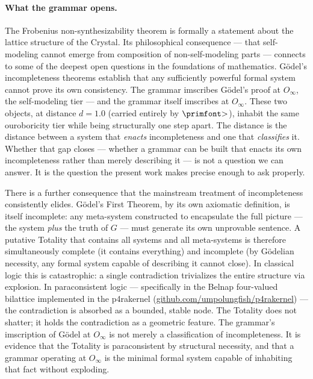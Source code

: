 \documentclass[12pt,a4paper]{article}
\makeatletter
\newcommand{\igprimfont}{\primfont}
\newcommand{\Oinf}{O_\infty}
\renewcommand{\_}{\ig@origunderscore\discretionary{}{}{}}
\makeatother
\begin{document}
\paragraph{What the grammar opens.}
The Frobenius non-synthesizability theorem is formally a statement
about the lattice structure of the Crystal. Its philosophical
consequence --- that self-modeling cannot emerge from composition of
non-self-modeling parts --- connects to some of the deepest open
questions in the foundations of mathematics. Gödel's incompleteness
theorems establish that any sufficiently powerful formal system cannot
prove its own consistency. The grammar imscribes Gödel's proof at
$\Oinf$, the self-modeling tier --- and the grammar itself imscribes at
$\Oinf$. These two objects, at distance $d = 1.0$ (carried entirely
by $\text{{\igprimfont >}}$), inhabit the same ouroboricity tier while being structurally
one step apart. The distance is the distance between a system that
\emph{enacts} incompleteness and one that \emph{classifies} it.
Whether that gap closes --- whether a grammar can be built that
enacts its own incompleteness rather than merely describing it ---
is not a question we can answer. It is the question the present
work makes precise enough to ask properly.

There is a further consequence that the mainstream treatment of incompleteness
consistently elides. Gödel's First Theorem, by its own axiomatic definition,
is itself incomplete: any meta-system constructed to encapsulate the full
picture --- the system \emph{plus} the truth of $G$ --- must generate its own
unprovable sentence. A putative Totality that contains all systems and all
meta-systems is therefore simultaneously complete (it contains everything)
and incomplete (by G\"odelian necessity, any formal system capable of
describing it cannot close). In classical logic this is catastrophic: a
single contradiction trivializes the entire structure via explosion.
In paraconsistent logic --- specifically in the Belnap four-valued bilattice
implemented in the p4rakernel (\href{https://github.com/umpolungfish/p4rakernel}{github.com/umpolungfish/p4rakernel}) --- the contradiction
is absorbed as a bounded, stable node. The Totality does not shatter; it
holds the contradiction as a geometric feature. The grammar's imscription
of Gödel at $\Oinf$ is not merely a classification of incompleteness.
It is evidence that the Totality is paraconsistent by structural necessity,
and that a grammar operating at $\Oinf$ is the minimal formal system
capable of inhabiting that fact without exploding.
\end{document}
